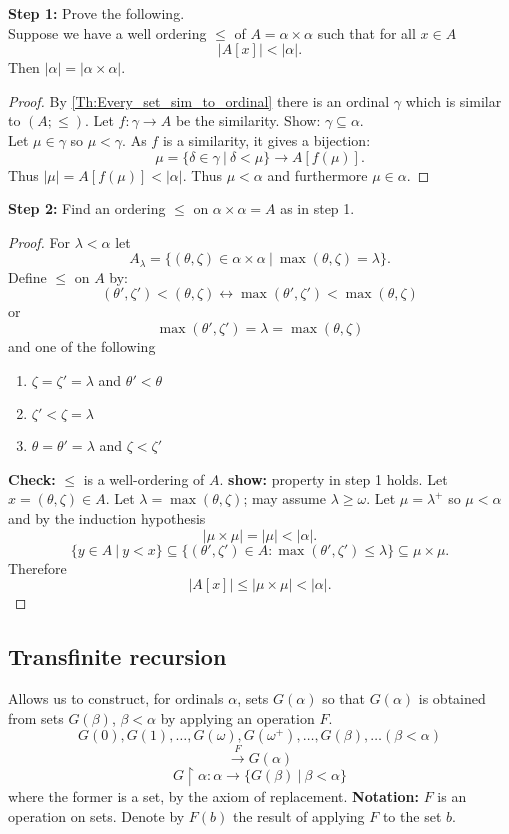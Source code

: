 \documentclass[a4paper,oneside,11pt,DIV=12,parskip=half]{scrartcl}
\theoremstyle{plain}
\theoremstyle{definition}
\newtheorem{remark, definition}[theorem]{Remark and Definition.}
\newtheorem{lemma, definition}[theorem]{Lemma and Definition.}
\newtheorem{theorem, definition}[theorem]{Theorem and Definition.}
\theoremstyle{remark}
\newtheorem*{remark, example}{\textbf{Remark and Exercise}}
\begin{document}
\textbf{Step 1:} Prove the following.\\
Suppose we have a well ordering $\leq$ of $A = \alpha \times \alpha$ such that for all $x \in A$
    \[ |A[x]| < |\alpha|. \]
Then $|\alpha| = |\alpha \times \alpha|$.
\begin{proof}
By \ref{Th:Every_set_sim_to_ordinal} there is an ordinal $\gamma$ which is similar to $(A;\leq)$. Let $f: \gamma \rightarrow A$ be the similarity. Show: $\gamma \subseteq \alpha$.\\
Let $\mu \in \gamma$ so $\mu < \gamma$. As $f$ is a similarity, it gives a bijection:
    \[ \mu = \{ \delta \in \gamma ~|~ \delta < \mu \} \rightarrow A[f(\mu)]. \]
Thus $|\mu| = A[f(\mu)] < |\alpha|$.
Thus $\mu < \alpha$ and furthermore $\mu \in \alpha$.
\end{proof}

\textbf{Step 2:} Find an ordering $\leq$ on $\alpha \times \alpha = A$ as in step 1.
\begin{proof}
For $\lambda < \alpha$ let
    \[ A_\lambda = \{ (\theta,\zeta) \in \alpha \times \alpha ~|~ \max(\theta, \zeta) = \lambda \}. \]
Define $\leq$ on $A$ by:
    \[ (\theta',\zeta') < (\theta,\zeta) \leftrightarrow \max(\theta',\zeta') < \max(\theta,\zeta)\] or \[ \max(\theta',\zeta') = \lambda = \max(\theta,\zeta)  \] and one of the following
\begin{enumerate}
    \item $\zeta = \zeta' =\lambda$ and $\theta' < \theta$
    \item $\zeta' < \zeta = \lambda$
    \item $\theta = \theta' =\lambda$ and $\zeta < \zeta'$
\end{enumerate}

\textbf{Check:} $\leq$ is a well-ordering of $A$.
\textbf{show:} property in step 1 holds.
Let $x = (\theta,\zeta) \in A$. Let $ \lambda = \max (\theta,\zeta)$; may assume $\lambda \geq \omega$. Let $\mu = \lambda^+$ so $\mu < \alpha$ and by the induction hypothesis
    \[ |\mu \times \mu| = |\mu| < |\alpha|. \]
    \[ \{ y \in A ~|~ y < x \} \subseteq \{(\theta',\zeta') \in A: \max (\theta',\zeta') \leq \lambda \} \subseteq \mu \times \mu. \]
Therefore
    \[ |A[x]| \leq | \mu \times \mu| < |\alpha|. \]
\end{proof}

\subsection{Transfinite recursion}
Allows us to construct, for ordinals $\alpha$, sets $G(\alpha)$ so that $G(\alpha)$ is obtained from sets $G(\beta)$, $\beta < \alpha$ by applying an operation $F$.
    \[ G(0),G(1),\dots,G(\omega),G(\omega^+),\dots,G(\beta),\dots (\beta < \alpha) \]
    \[ \xrightarrow{F} G(\alpha) \]
    \[ G\upharpoonright \alpha: \alpha \rightarrow \{ G(\beta) ~|~ \beta < \alpha \} \]
    where the former is a set, by the axiom of replacement.
\textbf{Notation:} $F$ is an operation on sets. Denote by $F(b)$ the result of applying $F$ to the set $b$.
\end{document}
